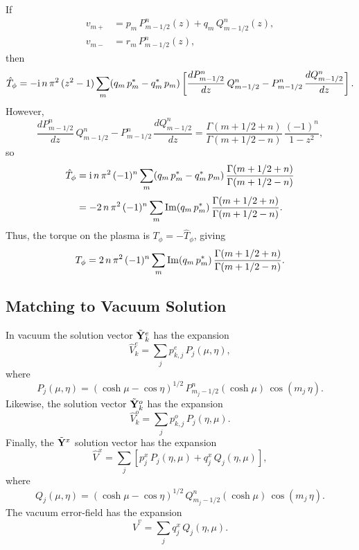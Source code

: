 \documentclass[12pt,prb,aps,notitlepage]{revtex4-1}
\begin{document}
If
\begin{align}
v_{m+} &= p_m\,P_{m-1/2}^n(z)+ q_m\,Q_{m-1/2}^n(z),\\[0.5ex]
v_{m-} &= r_m\,P_{m-1/2}^n(z),
\end{align}
then
\begin{equation}
\hat{T}_\phi = -{\rm i}\,n\,\pi^2\,(z^2-1)\sum_m (q_m\,p_m^\ast-q_m^\ast\,p_m)\left[
\frac{dP_{m-1/2}^n}{dz}\, Q_{m-1/2}^n - P_{m-1/2}^n\,\frac{dQ_{m-1/2}^n}{dz}\right].
\end{equation}
However,
\begin{equation}
\frac{dP_{m-1/2}^n}{dz}\, Q_{m-1/2}^n - P_{m-1/2}^n\,\frac{dQ_{m-1/2}^n}{dz}= \frac{\Gamma(m+1/2+n)}{\Gamma(m+1/2-n)}\,\frac{(-1)^n}{1-z^2},
\end{equation}
so
\begin{align}
\hat{T}_\phi &= {\rm i}\,n\,\pi^2\,(-1)^n\sum_m (q_m\,p_m^\ast-q_m^\ast\,p_m)\,\frac{\Gamma(m+1/2+n)}{\Gamma(m+1/2-n)}\nonumber\\[0.5ex]
&= -2\,n\,\pi^2\,(-1)^n\sum_m {\rm Im}(q_m\,p_m^\ast)\,\frac{\Gamma(m+1/2+n)}{\Gamma(m+1/2-n)}.
\end{align}
Thus, the torque on the plasma is $T_\phi = -\hat{T}_\phi$, giving
\begin{equation}
T_\phi =2\,n\,\pi^2\,(-1)^n\sum_m {\rm Im}(q_m\,p_m^\ast)\,\frac{\Gamma(m+1/2+n)}{\Gamma(m+1/2-n)}.
\end{equation}

\subsection{Matching to Vacuum Solution}
In vacuum the solution vector $\tilde{\bf Y}_k^e$ has the expansion
\begin{equation}
\hat{V}_k^e = \sum_j p_{k,j}^e\,P_j(\mu,\eta),
\end{equation}
where
\begin{equation}
P_j(\mu,\eta) =(\cosh\mu-\cos\eta)^{1/2}\,P_{m_j-1/2}^n(\cosh\mu)\,\cos(m_j\,\eta).
\end{equation}
Likewise, the solution vector $\tilde{\bf Y}_k^o$ has the expansion
\begin{equation}
\hat{V}_k^o = \sum_j p_{k,j}^o\,P_j(\eta,\mu).
\end{equation}
Finally, the $\tilde{\bf Y}^x$ solution vector has the expansion
\begin{equation}
\hat{V}^x = \sum_j \left[p_j^x\,P_j(\eta,\mu)+ q_j^x\,Q_j(\eta,\mu)\right],
\end{equation}
where
\begin{equation}
Q_j(\mu,\eta) =(\cosh\mu-\cos\eta)^{1/2}\,Q_{m_j-1/2}^n(\cosh\mu)\,\cos(m_j\,\eta).
\end{equation}
The vacuum error-field has the expansion
\begin{equation}
\hat{V}^v = \sum_j q_j^x\,Q_j(\eta,\mu).
\end{equation}
\end{document}
